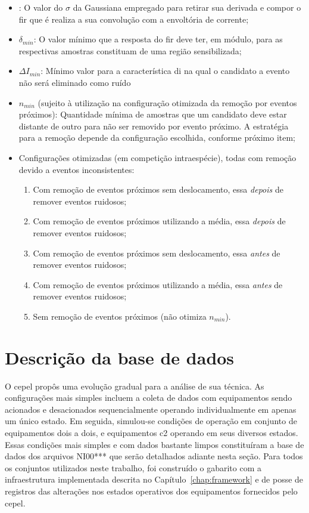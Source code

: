 \begin{itemize}
\item {}: O valor do
$\sigma$ da Gaussiana empregado para retirar sua derivada e compor o
\acs{fir} que é realiza a sua convolução com a envoltória de corrente;
\item $\delta_{min}$: O valor mínimo que a resposta do \acs{fir} deve
ter, em módulo, para as respectivas amostras constituam de uma região
sensibilizada;
\item $\Delta{I}_{min}$: Mínimo valor para a característica \acs{di} na
qual o candidato a evento não será eliminado como ruído
\item $n_{min}$ (sujeito à utilização na configuração otimizada da
remoção por eventos próximos): Quantidade mínima de amostras que um
candidato deve estar distante de outro para não ser removido por evento
próximo. A estratégia para a remoção depende da configuração
escolhida, conforme próximo item;
\item Configurações otimizadas (em competição intraespécie), todas com
remoção devido a eventos inconsistentes:
\begin{enumerate}[label={Espécie} (\Roman*) -,ref=(\Roman*),align=left]
\item\label{item:esp1} Com remoção de eventos próximos sem
deslocamento, essa \emph{depois} de remover eventos ruidosos;
\item\label{item:esp2} Com remoção de eventos próximos utilizando a
média, essa \emph{depois} de remover eventos ruidosos;
\item\label{item:esp3} Com remoção de eventos próximos sem
deslocamento, essa \emph{antes} de remover eventos ruidosos;
\item\label{item:esp4} Com remoção de eventos próximos utilizando a
média, essa \emph{antes} de remover eventos ruidosos;
\item\label{item:esp5} Sem remoção de eventos próximos (não otimiza
$n_{min}$).
\end{enumerate}
\end{itemize}


\section{Descrição da base de dados}
\label{sec:base_de_dados}

O \acs{cepel} propôs uma evolução gradual para a análise de sua
técnica. As configurações mais simples incluem a coleta de dados com
equipamentos sendo acionados e desacionados sequencialmente operando
individualmente em apenas um único estado. Em seguida, simulou-se
condições de operação em conjunto de equipamentos dois a dois, e
equipamentos \acs{c2} operando em seus diversos estados. Essas
condições mais simples e com dados bastante limpos constituíram a base
de dados dos arquivos NI00*** que serão detalhados adiante nesta
seção. Para todos os conjuntos utilizados neste trabalho, foi
construído o gabarito com a infraestrutura implementada descrita no
Capítulo~\ref{chap:framework} e de posse de registros das alterações
nos estados operativos dos equipamentos fornecidos pelo \acs{cepel}.

